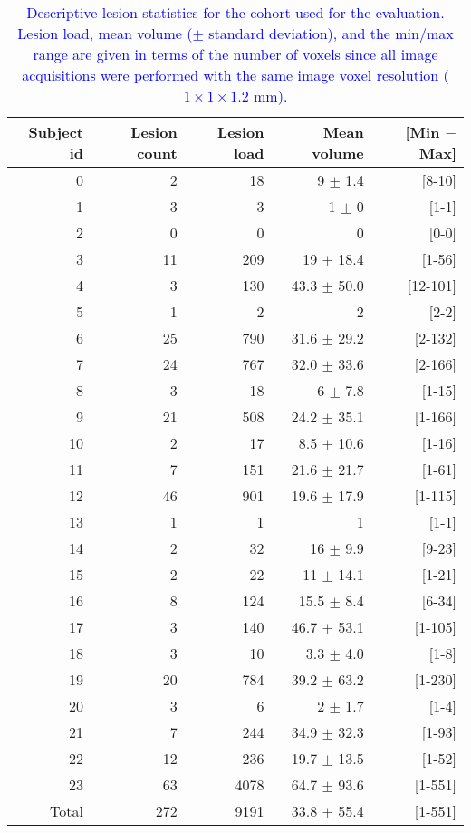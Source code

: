 \begin{table}[!htb]
  \centering
  \begin{tabular*}{1.0\textwidth}{@{\extracolsep{\fill}} rrrrr}
    \textbf{Subject id} & \textbf{Lesion count} & \textbf{Lesion load} & \textbf{Mean volume} & \textbf{[Min $-$ Max]} \\
    \toprule
    \midrule
    0 & 2 & 18 & 9 $\pm$ 1.4 & [8-10] \\
    1 & 3 & 3 & 1 $\pm$ 0 & [1-1] \\
    2 & 0 & 0 & 0 & [0-0] \\
    3 & 11 & 209 & 19 $\pm$ 18.4 & [1-56] \\
    4 & 3 & 130 & 43.3 $\pm$ 50.0 & [12-101] \\
    5 & 1 & 2 & 2 & [2-2] \\
    6 & 25 & 790 & 31.6 $\pm$ 29.2 & [2-132] \\
    7 & 24 & 767 & 32.0 $\pm$ 33.6 & [2-166] \\
    8 & 3 & 18 & 6 $\pm$ 7.8 & [1-15] \\
    9 & 21 & 508 & 24.2 $\pm$ 35.1 & [1-166] \\
    10 & 2 & 17 & 8.5 $\pm$ 10.6 & [1-16] \\
    11 & 7 & 151 & 21.6 $\pm$ 21.7 & [1-61] \\
    12 & 46 & 901 & 19.6 $\pm$ 17.9 & [1-115] \\
    13 & 1 & 1 & 1 & [1-1] \\
    14 & 2 & 32 & 16 $\pm$ 9.9 & [9-23] \\
    15 & 2 & 22 & 11 $\pm$ 14.1 & [1-21] \\
    16 & 8 & 124 & 15.5 $\pm$ 8.4 & [6-34] \\
    17 & 3 & 140 & 46.7 $\pm$ 53.1 & [1-105] \\
    18 & 3 & 10 & 3.3 $\pm$ 4.0 & [1-8] \\
    19 & 20 & 784 & 39.2 $\pm$ 63.2 & [1-230] \\
    20 & 3 & 6 & 2 $\pm$ 1.7 & [1-4] \\
    21 & 7 & 244 & 34.9 $\pm$ 32.3 & [1-93] \\
    22 & 12 & 236 & 19.7 $\pm$ 13.5 & [1-52] \\
    23 & 63 & 4078 & 64.7 $\pm$ 93.6 & [1-551] \\
    \midrule
    Total & 272 & 9191 & 33.8 $\pm$ 55.4 & [1-551] \\
    \midrule
    \bottomrule
  \end{tabular*}
\label{table:trainingData}
\caption{\textcolor{blue}{Descriptive lesion statistics for the cohort used for the evaluation.
         Lesion load, mean volume ($\pm$ standard deviation), and the min/max range are given in terms of
         the number of voxels
         since all image acquisitions were performed with the same image
         voxel resolution ($1\times1\times1.2$ mm)}.
         }
\end{table}
